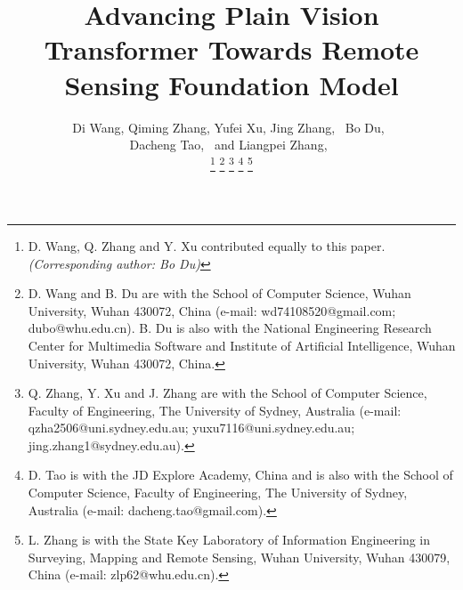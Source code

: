 \documentclass[10pt, journal,twoside]{IEEEtran}
\begin{document}
\title{
Advancing Plain Vision Transformer Towards Remote Sensing Foundation Model
}


\author{Di Wang,
        Qiming Zhang,
        Yufei Xu,
        Jing Zhang,~
        Bo Du,~\\
        Dacheng Tao,~
        and Liangpei Zhang,~


\thanks{D. Wang, Q. Zhang and Y. Xu contributed equally to this paper. \textit{(Corresponding author: Bo Du)}}
\thanks{D. Wang and B. Du are with the School of Computer Science, Wuhan University, Wuhan 430072, China (e-mail: wd74108520@gmail.com; dubo@whu.edu.cn). B. Du is also with the National Engineering Research Center for Multimedia Software and Institute of Artificial Intelligence, Wuhan University, Wuhan 430072, China.}
\thanks{Q. Zhang, Y. Xu and J. Zhang are with the School of Computer Science, Faculty of Engineering, The University of Sydney, Australia (e-mail: qzha2506@uni.sydney.edu.au; yuxu7116@uni.sydney.edu.au; jing.zhang1@sydney.edu.au).}
\thanks{D. Tao is with the JD Explore Academy, China and is also with the School of Computer Science, Faculty of Engineering, The University of Sydney, Australia (e-mail: dacheng.tao@gmail.com).}
\thanks{L. Zhang is with the State Key Laboratory of Information Engineering in Surveying, Mapping and Remote Sensing, Wuhan University, Wuhan 430079, China (e-mail: zlp62@whu.edu.cn).}
}



















\maketitle
\end{document}
